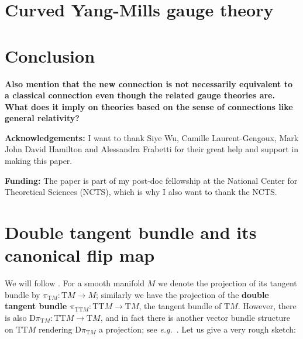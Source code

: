 \documentclass[a4paper,oneside,11pt,bibliography=totoc]{scrartcl}
\renewcommand{\theequation}{\arabic{equation}}
\renewcommand{\listoffigures}{\begingroup
\tocsection
\tocfile{\listfigurename}{lof}
\endgroup}
\renewcommand{\listoftables}{\begingroup
\tocsection
\tocfile{\listtablename}{lot}
\endgroup}
\theoremstyle{plain}
\theoremstyle{remark}
\theoremstyle{definition}
\begin{document}
\section{Curved Yang-Mills gauge theory}

\section{Conclusion}

\textbf{Also mention that the new connection is not necessarily equivalent to a classical connection even though the related gauge theories are. What does it imply on theories based on the sense of connections like general relativity?}

\textbf{Acknowledgements:} I want to thank Siye Wu, Camille Laurent-Gengoux, Mark John David Hamilton and Alessandra Frabetti for their great help and support in making this paper.

\textbf{Funding:} The paper is part of my post-doc fellowship at the National Center for Theoretical Sciences (NCTS), which is why I also want to thank the NCTS.





\appendix
\setcounter{equation}{0}
\renewcommand{\theequation}{\Alph{section}.\arabic{equation}} %

\renewcommand\refname{List of References}






\section{Double tangent bundle and its canonical flip map}\label{DoubleTangentFlip}

We will follow \cite[\S 9.6, page 363]{mackenzieGeneralTheory}. For a smooth manifold $M$ we denote the projection of its tangent bundle by $\pi_{\mathrm{T}M}: \mathrm{T}M \to M$; similarly we have the projection of the \textbf{double tangent bundle $\pi_{\mathrm{TT}M}: \mathrm{TT}M \to \mathrm{T}M$}, the tangent bundle of $\mathrm{T}M$. However, there is also $\mathrm{D}\pi_{\mathrm{T}M}: \mathrm{TT}M \to \mathrm{T}M$, and in fact there is another vector bundle structure on $\mathrm{TT}M$ rendering $\mathrm{D}\pi_{\mathrm{T}M}$ a projection; see \textit{e.g.}\ \cite[\S 3.4 \textit{et seq.}; page 110ff.]{mackenzieGeneralTheory}. Let us give a very rough sketch:
\end{document}
